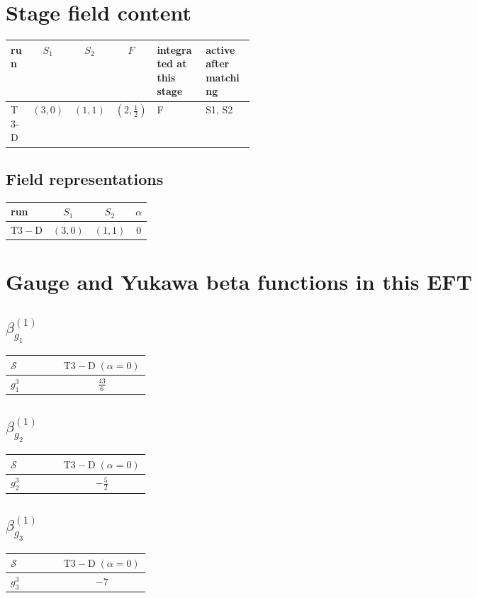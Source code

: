 \documentclass[9pt]{article}
\begin{document}
\section*{Stage field content}
\begin{longtable}{@{}lccc p{0.20\linewidth}p{0.20\linewidth}@{}}
\toprule
run & $S_1$ & $S_2$ & $F$ & integrated at this stage & active after matching \\
\midrule
T3-D & $(3,0)$ & $(1,1)$ & $(2,\frac{1}{2})$ & F & S1, S2 \\
\bottomrule
\end{longtable}
\subsection*{Field representations}
\begin{longtable}{@{}lccc@{}}
\toprule
run & $S_1$ & $S_2$ & $\alpha$ \\
\midrule
$\mathrm{T3-D}$ & $(3,0)$ & $(1,1)$ & $0$ \\
\bottomrule
\end{longtable}
\section*{Gauge and Yukawa beta functions in this EFT}
\subsection*{$ \beta_{g_1}^{(1)} $}
\begin{longtable}{@{}p{0.38\linewidth}c@{}}
\toprule
$\mathcal{S}$ & $ \mathrm{T3-D}\;(\alpha=0) $ \\
\midrule
$ g_1^3 $ & $ \frac{43}{6} $ \\
\bottomrule
\end{longtable}
\subsection*{$ \beta_{g_2}^{(1)} $}
\begin{longtable}{@{}p{0.38\linewidth}c@{}}
\toprule
$\mathcal{S}$ & $ \mathrm{T3-D}\;(\alpha=0) $ \\
\midrule
$ g_2^3 $ & $ - \frac{5}{2} $ \\
\bottomrule
\end{longtable}
\subsection*{$ \beta_{g_3}^{(1)} $}
\begin{longtable}{@{}p{0.38\linewidth}c@{}}
\toprule
$\mathcal{S}$ & $ \mathrm{T3-D}\;(\alpha=0) $ \\
\midrule
$ g_3^3 $ & $ -7 $ \\
\bottomrule
\end{longtable}
\end{document}
